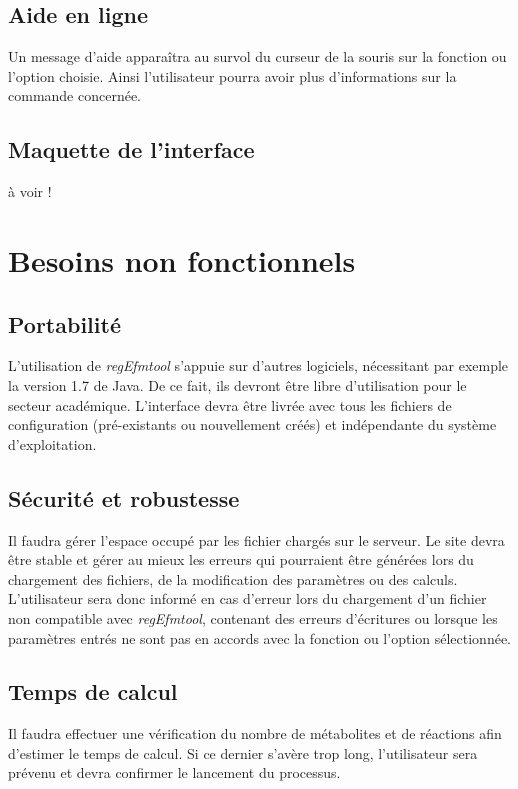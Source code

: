 \subsection{Aide en ligne}
Un message d'aide apparaîtra au survol du curseur de la souris sur la fonction ou l'option choisie. Ainsi l'utilisateur pourra avoir plus d'informations sur la commande concernée.

\subsection{Maquette de l'interface}
à voir !

\section{Besoins non fonctionnels}

\subsection{Portabilité}
L'utilisation de \textit{regEfmtool} s'appuie sur d'autres logiciels, nécessitant par exemple la version 1.7 de Java. De ce fait, ils devront être libre d'utilisation pour le secteur académique. L'interface devra être livrée avec tous les fichiers de configuration (pré-existants ou nouvellement créés) et indépendante du système d'exploitation. 

\subsection{Sécurité et robustesse}
Il faudra gérer l'espace occupé par les fichier chargés sur le serveur. Le site devra être stable et gérer au mieux les erreurs qui pourraient être générées lors du chargement des fichiers, de la modification des paramètres ou des calculs. L'utilisateur sera donc informé en cas d'erreur lors du chargement d'un fichier non compatible avec \textit{regEfmtool}, contenant des erreurs d'écritures ou lorsque les paramètres entrés ne sont pas en accords avec la fonction ou l'option sélectionnée. 

\subsection{Temps de calcul}
Il faudra effectuer une vérification du nombre de métabolites et de réactions afin d'estimer le temps de calcul. Si ce dernier s'avère trop long, l'utilisateur sera prévenu et devra confirmer le lancement du processus. 

